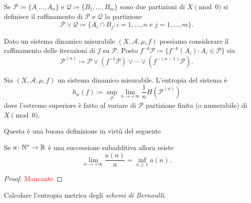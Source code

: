 \begin{definition}
    Se $ \mathcal{P} \coloneqq \{A_, \ldots, A_n\} $ e $ \mathcal{Q} \coloneqq \{B_1, \ldots, B_m\} $ sono due partizioni di $ X \pmod{0} $ si definisce il raffinamento di $ \mathcal{P} $ e $ \mathcal{Q} $ la partizione
    \[
        \mathcal{P} \vee \mathcal{Q} \coloneqq \{A_i \cap B_j : i = 1, \ldots, n \text{ e } j = 1, \ldots, m\}.
    \]
\end{definition}

Dato un sistema dinamico misurabile $ (X, \mathcal{A}, \mu, f) $ possiamo considerare il raffinamento delle iterazioni di $ f $ su $ \mathcal{P} $. Posto $ f^{-k}\mathcal{P} \coloneqq \{f^{-k}(A_i) : A_i \in \mathcal{P}\} $ sia
\[
    \mathcal{P}^{(n)} \coloneqq \mathcal{P} \vee (f^{-1}\mathcal{P}) \vee \cdots \vee (f^{-(n-1)}\mathcal{P}).
\]

\begin{definition}
    Sia $ (X, \mathcal{A}, \mu, f) $ un sistema dinamico misurabile. L'entropia del sistema è
    \[
        h_\mu(f) \coloneqq \sup_\mathcal{P} {\lim_{n \to +\infty} \frac{1}{n}H(\mathcal{P}^{(n)})}
    \]
    dove l'estremo superiore è fatto al variare di $ \mathcal{P} $ partizione finita (o numerabile) di $ X \pmod{0} $.
\end{definition}

Questa è una buona definizione in virtù del seguente
\begin{lemma}[Fekete] \label{lem:fekete}
    Se $ a \colon \mathbb{N}^{*} \to \mathbb{R} $ è una successione subadditiva allora esiste
    \[
        \lim_{n\to+\infty} \frac{a(n)}{n} = \inf_{n\geq1}a(n).
    \]
\end{lemma}
\begin{proof}
    \textcolor{red}{Mancante}
\end{proof}

\begin{exercise}
    Calcolare l'entropia metrica degli \emph{schemi di Bernoulli}.
\end{exercise}
